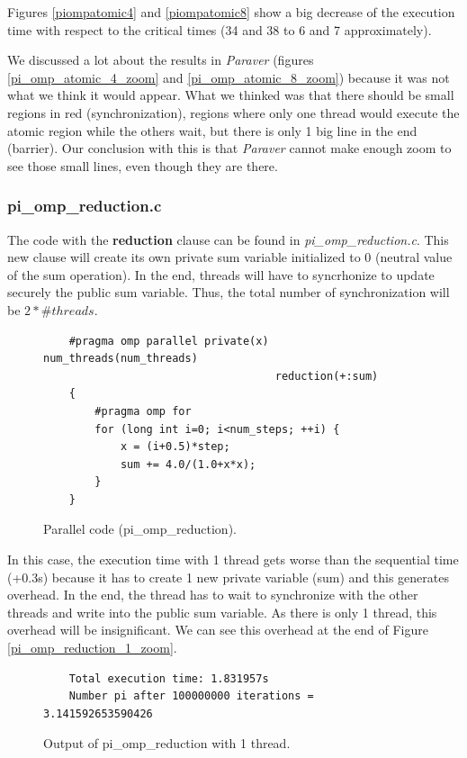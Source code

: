 \documentclass[12pt, a4paper]{article}
\begin{document}
Figures \ref{piompatomic4} and \ref{piompatomic8} show a big decrease of the execution time with respect to the critical times (34 and 38 to 6 and 7 approximately).

We discussed a lot about the results in \textit{Paraver} (figures \ref{pi_omp_atomic_4_zoom} and \ref{pi_omp_atomic_8_zoom}) because it was not what we think it would appear. What we thinked was that there should be small regions in red (synchronization), regions where only one thread would execute the atomic region while the others wait, but there is only 1 big line in the end (barrier). Our conclusion with this is that \textit{Paraver} cannot make enough zoom to see those small lines, even though they are there.

\subsubsection{pi\_omp\_reduction.c}

The code with the \textbf{reduction} clause can be found in \textit{pi\_omp\_reduction.c}. This new clause will create its own private sum variable initialized to 0 (neutral value of the sum operation). In the end, threads will have to syncrhonize to update securely the public sum variable. Thus, the total number of synchronization will be $2 * \#threads$.

\begin{figure}[H]
	\begin{lstlisting}
	#pragma omp parallel private(x) num_threads(num_threads)
								    reduction(+:sum)
    {
        #pragma omp for 
        for (long int i=0; i<num_steps; ++i) {
            x = (i+0.5)*step;
	    	sum += 4.0/(1.0+x*x);
        }
    }

	\end{lstlisting}
	
	\caption{Parallel code (pi\_omp\_reduction).}
\end{figure}

In this case, the execution time with 1 thread gets worse than the sequential time (+0.3s) because it has to create 1 new private variable (sum) and this generates overhead. In the end, the thread has to wait to synchronize with the other threads and write into the public sum variable. As there is only 1 thread, this overhead will be insignificant. We can see this overhead at the end of Figure \ref{pi_omp_reduction_1_zoom}.

\begin{figure}[H]
	\begin{lstlisting}
	Total execution time: 1.831957s
	Number pi after 100000000 iterations = 3.141592653590426		
	\end{lstlisting}
	\caption{Output of pi\_omp\_reduction with 1 thread.}
	\label{piompreduction1}
\end{figure}
\end{document}
